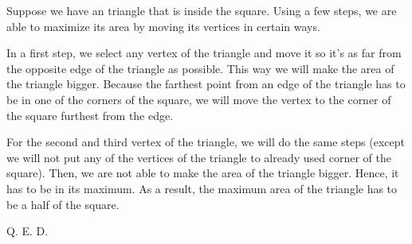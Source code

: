 \documentclass{fkssolpub}
\author{Ondřej Sedláček}
\begin{document}
Suppose we have an triangle that is inside the square. Using a few steps,
we are able to maximize its area by moving its vertices in certain ways.

In a first step, we select any vertex of the triangle and move it so it's
as far from the opposite edge of the triangle as possible. This way we
will make the area of the triangle bigger. Because the farthest point from
an edge of the triangle has to be in one of the corners of the square, we
will move the vertex to the corner of the square furthest from the edge.

For the second and third vertex of the triangle, we will do the same
steps (except we will not put any of the vertices of the triangle to
already used corner of the square). Then, we are not able to make the area
of the triangle bigger. Hence, it has to be in its maximum. As a result,
the maximum area of the triangle has to be a half of the square.

Q. E. D.
\end{document}
